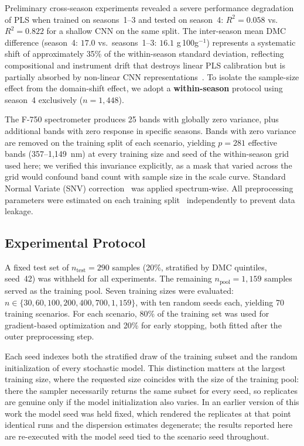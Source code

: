 \documentclass[preprint,12pt,hidelinks]{elsarticle}
\begin{document}
Preliminary cross-season experiments revealed a severe performance
degradation of PLS when trained on seasons~1--3 and tested on season~4:
$R^2 = 0.058$ vs.\ $R^2 = 0.822$ for a shallow CNN on the same split. The
inter-season mean DMC difference (season~4: $17.0$ vs.\ seasons~1--3: $16.1$
g\,100g$^{-1}$) represents a systematic shift of approximately 35\% of the
within-season standard deviation, reflecting compositional and instrument
drift that destroys linear PLS calibration but is partially absorbed by
non-linear CNN representations~\cite{anderson2020}. To isolate the
sample-size effect from the domain-shift effect, we adopt a
\textbf{within-season} protocol using season~4 exclusively ($n = 1{,}448$).

The F-750 spectrometer produces 25 bands with globally zero variance, plus
additional bands with zero response in specific seasons. Bands with zero
variance are removed on the training split of each scenario, yielding
$p = 281$ effective bands (357--1,149~nm) at every training size and seed of
the within-season grid used here; we verified this invariance explicitly, as
a mask that varied across the grid would confound band count with sample size
in the scale curve. Standard Normal Variate
(SNV) correction~\cite{barnes1989,savitzky1964} was applied spectrum-wise. All
preprocessing parameters were estimated on each training split~\cite{metz2022}
independently to prevent data leakage.

\subsection{Experimental Protocol}

A fixed test set of $n_{\mathrm{test}} = 290$ samples (20\%, stratified by
DMC quintiles, seed~42) was withheld for all experiments. The remaining
$n_{\mathrm{pool}} = 1{,}159$ samples served as the training pool. Seven
training sizes were evaluated: $n \in \{30, 60, 100, 200, 400, 700,
1{,}159\}$, with ten random seeds each, yielding 70 training scenarios.
For each scenario, 80\% of the training set was used for gradient-based
optimization and 20\% for early stopping, both fitted after the outer
preprocessing step.

\label{sec:protocol}
Each seed indexes both the stratified draw of the training subset and the
random initialization of every stochastic model. This distinction matters at
the largest training size, where the requested size coincides with the size
of the training pool: there the sampler necessarily returns the same subset
for every seed, so replicates are genuine only if the model initialization
also varies. In an earlier version of this work the model seed was held
fixed, which rendered the replicates at that point identical runs and the
dispersion estimates degenerate; the results reported here are re-executed
with the model seed tied to the scenario seed throughout.
\end{document}
